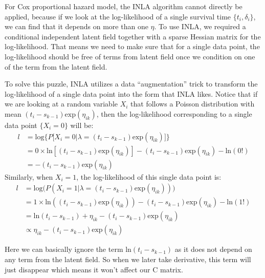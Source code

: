 \documentclass[]{article}
\begin{document}
For Cox proportional hazard model, the INLA algorithm cannot directly be
applied, because if we look at the log-likelihood of a single survival
time \(\{t_i,\delta_i\}\), we can find that it depends on more than one
\(\eta\). To use INLA, we required a conditional independent latent
field together with a sparse Hessian matrix for the log-likelihood. That
means we need to make sure that for a single data point, the
log-likelihood should be free of terms from latent field once we
condition on one of the term from the latent field.

To solve this puzzle, INLA utilizes a data ``augmentation'' trick to
transform the log-likelihood of a single data point into the form that
INLA likes. Notice that if we are looking at a random variable \(X_i\)
that follows a Poisson distribution with mean
\((t_i-s_{k-1})\text{exp}(\eta_{ik})\), then the log-likelihood
corresponding to a single data point \(\{X_i = 0 \}\) will be:
\begin{equation}\begin{aligned}\label{eqn:loglike1}
l &= \text{log}\bigg \{P\big [X_i =0|\lambda = (t_i-s_{k-1})\text{exp}(\eta_{ik}) \big]\bigg \}\\
  &= 0\times \text{ln}[(t_i-s_{k-1})\text{exp}(\eta_{ik})] - (t_i-s_{k-1})\text{exp}(\eta_{ik}) - \text{ln}(0!)\\
  &= - (t_i-s_{k-1})\text{exp}(\eta_{ik})
\end{aligned}\end{equation} Similarly, when \(X_i = 1\), the
log-likelihood of this single data point is:
\begin{equation}\begin{aligned}\label{eqn:loglike2}
l &= \text{log}\bigg(P(X_i =1|\lambda = (t_i-s_{k-1})\text{exp}(\eta_{ik}))\bigg)\\
  &= 1\times \text{ln}((t_i-s_{k-1})\text{exp}(\eta_{ik})) - (t_i-s_{k-1})\text{exp}(\eta_{ik}) - \text{ln}(1!)\\
  &= \text{ln}(t_i-s_{k-1})+\eta_{ik}-(t_i-s_{k-1})\text{exp}(\eta_{ik})\\
  &\propto \eta_{ik}-(t_i-s_{k-1})\text{exp}(\eta_{ik})
\end{aligned}\end{equation}

Here we can basically ignore the term \(\text{ln}(t_i-s_{k-1})\) as it
does not depend on any term from the latent field. So when we later take
derivative, this term will just disappear which means it won't affect
our C matrix.
\end{document}
